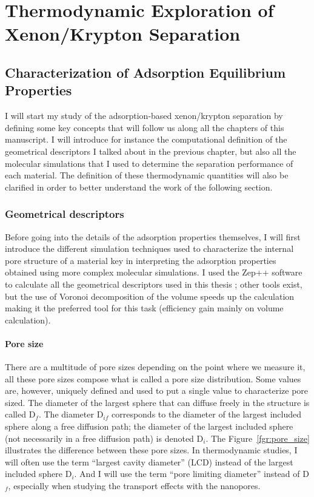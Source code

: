 \documentclass[main.tex]{subfiles}
\begin{document}
\chapter{Thermodynamic Exploration of Xenon/Krypton Separation}
\vspace*{-1\baselineskip}

\section{Characterization of Adsorption Equilibrium Properties}

I will start my study of the adsorption-based xenon/krypton separation by defining some key concepts that will follow us along all the chapters of this manuscript. I will introduce for instance the computational definition of the geometrical descriptors I talked about in the previous chapter, but also all the molecular simulations that I used to determine the separation performance of each material. The definition of these thermodynamic quantities will also be clarified in order to better understand the work of the following section.

\subsection{Geometrical descriptors}

Before going into the details of the adsorption properties themselves, I will first introduce the different simulation techniques used to characterize the internal pore structure of a material key in interpreting the adsorption properties obtained using more complex molecular simulations. I used the Zep++ software to calculate all the geometrical descriptors used in this thesis ;\autocite{Zeo++} other tools exist,\autocite{First_2013,PoreBlazer} but the use of Voronoi decomposition of the volume speeds up the calculation making it the preferred tool for this task (efficiency gain mainly on volume calculation).\autocite{Rycroft_2009} 

\subsubsection{Pore size}

There are a multitude of pore sizes depending on the point where we measure it, all these pore sizes compose what is called a pore size distribution. Some values are, however, uniquely defined and used to put a single value to characterize pore sized. The diameter of the largest sphere that can diffuse freely in the structure is called D$_f$. The diameter D$_{if}$ corresponds to the diameter of the largest included sphere along a free diffusion path; the diameter of the largest included sphere (not necessarily in a free diffusion path) is denoted D$_i$. The Figure~\ref{fgr:pore_size} illustrates the difference between these pore sizes. In thermodynamic studies, I will often use the term ``largest cavity diameter'' (LCD) instead of the largest included sphere D$_i$. And I will use the term ``pore limiting diameter''  instead of D$_f$, especially when studying the transport effects with the nanopores.
\end{document}
